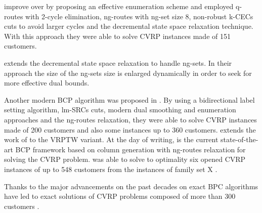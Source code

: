 \textcite{contardo2014} improve over \textcite{contardo2011}
by proposing an effective enumeration scheme and employed
q-routes with 2-cycle elimination, ng-routes with ng-set size 8,
non-robust k-CECs cuts to avoid larger cycles
and the decremental state space relaxation technique.
With this approach they were able to solve CVRP instances made of 151 customers.

\textcite{martinelli2014} extends the decremental state space relaxation
to handle ng-sets.
In their approach the size of the ng-sets size
is enlarged dynamically in order to seek for more effective dual bounds.


Another modern BCP algorithm was proposed in \textcite{pecin2017improved}.
By using a bidirectional label setting algorithm,
lm-SRCs cuts, modern dual smoothing and enumeration approaches
and the ng-routes relaxation, they were able to solve CVRP instances made of 200 customers
and also some instances up to 360 customers.
\textcite{pecin2017new} extends the work of \textcite{pecin2017improved} to the VRPTW variant.
At the day of writing, \textcite{pessoa2020a} is the current state-of-the-art
BCP framework based on column generation with ng-routes relaxation
for solving the CVRP problem.
\textcite{pessoa2020a} was able to solve to optimality six opened
CVRP instances of up to 548 customers from the instances of family set X \parencite{uchoa2017}.

Thanks to the major advancements on the past decades
on exact BPC algorithms
have led to exact solutions of CVRP problems composed of
more than 300 customers \parencite{costa2019}.

